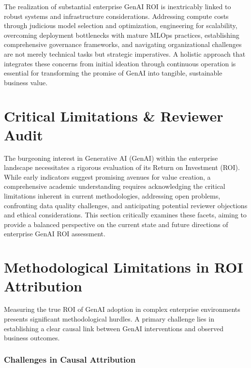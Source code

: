\documentclass{article}
\begin{document}
The realization of substantial enterprise GenAI ROI is inextricably linked to robust systems and infrastructure considerations. Addressing compute costs through judicious model selection and optimization, engineering for scalability, overcoming deployment bottlenecks with mature MLOps practices, establishing comprehensive governance frameworks, and navigating organizational challenges are not merely technical tasks but strategic imperatives. A holistic approach that integrates these concerns from initial ideation through continuous operation is essential for transforming the promise of GenAI into tangible, sustainable business value.

\cite{openalex_w4400993506}




\section{Critical Limitations \& Reviewer Audit}


The burgeoning interest in Generative AI (GenAI) within the enterprise landscape necessitates a rigorous evaluation of its Return on Investment (ROI). While early indicators suggest promising avenues for value creation, a comprehensive academic understanding requires acknowledging the critical limitations inherent in current methodologies, addressing open problems, confronting data quality challenges, and anticipating potential reviewer objections and ethical considerations. This section critically examines these facets, aiming to provide a balanced perspective on the current state and future directions of enterprise GenAI ROI assessment.


\section{Methodological Limitations in ROI Attribution}


Measuring the true ROI of GenAI adoption in complex enterprise environments presents significant methodological hurdles. A primary challenge lies in establishing a clear causal link between GenAI interventions and observed business outcomes.


\subsubsection{Challenges in Causal Attribution}
\end{document}
